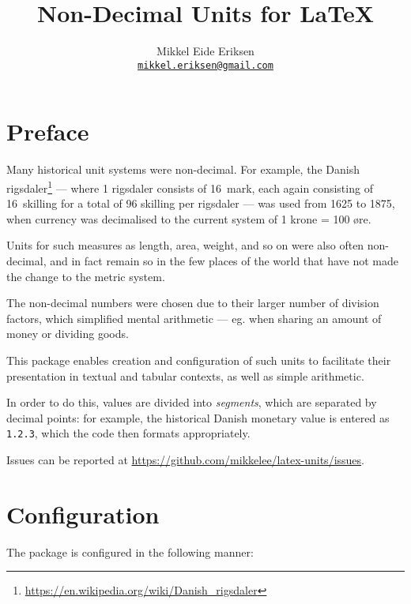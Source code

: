 \documentclass[
	a4paper,
	margin=4cm
]{article}
\title{Non-Decimal Units for \LaTeX}
\author{Mikkel Eide Eriksen\\\href{mailto:mikkel.eriksen@gmail.com}{\texttt{mikkel.eriksen@gmail.com}}}
\begin{document}
\maketitle

\section{Preface} %

Many historical unit systems were non-decimal. For example, the Danish rigsdaler\footnote{\url{https://en.wikipedia.org/wiki/Danish_rigsdaler}} --- where 1 rigsdaler consists of 16~mark, each again consisting of 16~skilling for a total of 96 skilling per rigsdaler --- was used from 1625 to 1875, when currency was decimalised to the current system of 1 krone = 100 øre.


Units for such measures as length, area, weight, and so on were also often non-decimal, and in fact remain so in the few places of the world that have not made the change to the metric system.

The non-decimal numbers were chosen due to their larger number of division factors, which simplified mental arithmetic --- eg. when sharing an amount of money or dividing goods.

This package enables creation and configuration of such units to facilitate their presentation in textual and tabular contexts, as well as simple arithmetic.

In order to do this, values are divided into \emph{segments}, which are separated by decimal points: for example, the historical Danish monetary value  is entered as \texttt{1.2.3}, which the code then formats appropriately.

Issues can be reported at \url{https://github.com/mikkelee/latex-units/issues}.

\clearpage
\section{Configuration} %

The package is configured in the following manner:
\end{document}
